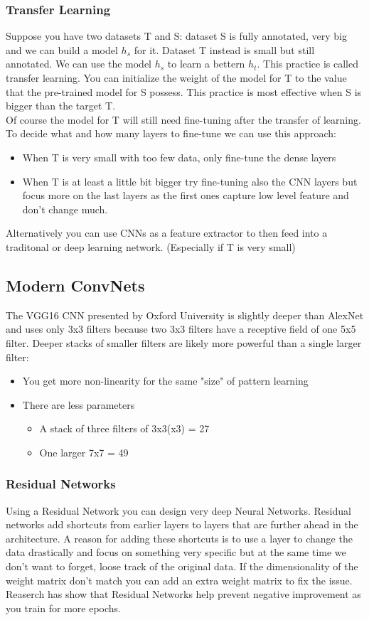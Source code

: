 \documentclass{article}
\begin{document}
\subsubsection{Transfer Learning}
Suppose you have two datasets T and S: dataset S is fully annotated, very big and we can build a model $h_s$ for it. Dataset T instead is small but still annotated. We can use the model $h_s$ to learn a bettern $h_t$. This practice is called transfer learning. You can initialize the weight of the model for T to the value that the pre-trained model for S possess. This practice is most effective when S is bigger than the target T.\\ Of course the model for T will still need fine-tuning after the transfer of learning. To decide what and how many layers to fine-tune we can use this approach:
\begin{itemize}
    \item When T is very small with too few data, only fine-tune the dense layers
    \item When T is at least a little bit bigger try fine-tuning also the CNN layers but focus more on the last layers as the first ones capture low level feature and don't change much.
\end{itemize}
Alternatively you can use CNNs as a feature extractor to then feed into a traditonal or deep learning network. (Especially if T is very small)
\subsection{Modern ConvNets}
The VGG16 CNN presented by Oxford University is slightly deeper than AlexNet and uses only 3x3 filters because two 3x3 filters have a receptive field of one 5x5 filter. Deeper stacks of smaller filters are likely more powerful than a single larger filter:
\begin{itemize}
    \item You get more non-linearity for the same "size" of pattern learning
    \item There are less parameters
    \begin{itemize}
        \item A stack of three filters of 3x3(x3) = 27
        \item One larger 7x7 = 49
    \end{itemize}
\end{itemize}
\subsubsection{Residual Networks}
Using a Residual Network you can design very deep Neural Networks. Residual networks add shortcuts from earlier layers to layers that are further ahead in the architecture. A reason for adding these shortcuts is to use a layer to change the data drastically and focus on something very specific but at the same time we don't want to forget, loose track of the original data. If the dimensionality of the weight matrix don't match you can add an extra weight matrix to fix the issue. Reaserch has show that Residual Networks help prevent negative improvement as you train for more epochs.
\end{document}
